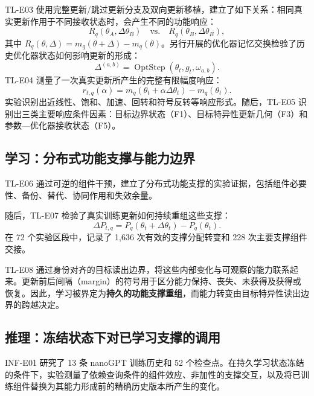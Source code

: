 TL-E03 使用完整更新/跳过更新分支及双向更新移植，建立了如下关系：相同真实更新作用于不同接收状态时，会产生不同的功能响应：
\begin{equation}
 R_q(\theta_A,\Delta\theta_B)\quad\text{vs.}\quad R_q(\theta_B,\Delta\theta_B),
 \label{eq:receiver}
\end{equation}
其中 $R_q(\theta,\Delta)=m_q(\theta+\Delta)-m_q(\theta)$。另行开展的优化器记忆交换检验了历史优化器状态如何影响更新的形成：
\begin{equation}
 \Delta^{(a,b)}=\operatorname{OptStep}(\theta_t,g_t,\omega_{a,b}).
 \label{eq:optmem}
\end{equation}
TL-E04 测量了一次真实更新所产生的完整有限幅度响应：
\begin{equation}
 r_{t,q}(\alpha)=m_q(\theta_t+\alpha\Delta\theta_t)-m_q(\theta_t).
 \label{eq:response}
\end{equation}
实验识别出近线性、饱和、加速、回转和符号反转等响应形式。随后，TL-E05 识别出三类主要响应条件因素：目标边界状态（F1）、目标特异性更新几何（F3）和参数—优化器接收状态（F5）。

\subsection{学习：分布式功能支撑与能力边界}

TL-E06 通过可逆的组件干预，建立了分布式功能支撑的实验证据，包括组件必要性、备份、替代、协同作用和失效余量。

随后，TL-E07 检验了真实训练更新如何持续重组这些支撑：
\begin{equation}
 \Delta P_{t,q}=P_q(\theta_t+\Delta\theta_t)-P_q(\theta_t).
 \label{eq:realloc}
\end{equation}
在 72 个实验区段中，记录了 1,636 次有效的支撑分配转变和 228 次主要支撑组件交接。

TL-E08 通过身份对齐的目标读出边界，将这些内部变化与可观察的能力联系起来。更新前后间隔（margin）的符号用于区分能力保持、丧失、未获得及获得或恢复。因此，学习被界定为\textbf{持久的功能支撑重组}，而能力转变由目标特异性读出边界的跨越决定。

\subsection{推理：冻结状态下对已学习支撑的调用}

INF-E01 研究了 13 条 nanoGPT 训练历史和 52 个检查点。在持久学习状态冻结的条件下，实验测量了依赖查询条件的组件效应、非加性的支撑交互，以及将已训练组件替换为其能力形成前的精确历史版本所产生的变化。

